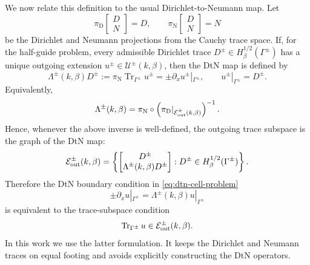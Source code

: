 \documentclass[11pt,fleqn]{article}
\theoremstyle{definition}
\theoremstyle{remark}
\begin{document}
We now relate this definition to the usual Dirichlet-to-Neumann map. Let
\[
  \pi_\mathrm{D}
  \begin{bmatrix}
    D\\ N
  \end{bmatrix}
  =D,
  \qquad
  \pi_\mathrm{N}
  \begin{bmatrix}
    D\\ N
  \end{bmatrix}
  =N
\]
be the Dirichlet and Neumann projections from the Cauchy trace space. If, for the
half-guide problem, every admissible Dirichlet trace \(D^\pm\in H^{1/2}_\beta(\Gamma^\pm)\)
has a unique outgoing extension \(u^\pm\in\mathcal U^\pm(k,\beta)\), then the DtN map is
defined by
\[
  \Lambda^\pm(k,\beta)D^\pm
  :=
  \pi_\mathrm{N} \operatorname{Tr}_{\Gamma^\pm}u^\pm
  =
  \pm \partial_x u^\pm|_{\Gamma^\pm},
  \qquad
  u^\pm|_{\Gamma^\pm}=D^\pm .
\]
Equivalently,
\[
  \Lambda^\pm(k,\beta)
  =
  \pi_\mathrm{N}\circ
  \left(
    \pi_\mathrm{D}|_{\mathcal E^\pm_{\rm out}(k,\beta)}
  \right)^{-1}.
\]
Hence, whenever the above inverse is well-defined, the outgoing trace subspace is the
graph of the DtN map:
\[
  \mathcal E^\pm_{\rm out}(k,\beta)
  =
  \left\{
    \begin{bmatrix}
      D^\pm\\
      \Lambda^\pm(k,\beta)D^\pm
    \end{bmatrix}
    :
    D^\pm\in H^{1/2}_\beta(\Gamma^\pm)
  \right\}.
\]
Therefore the DtN boundary condition in \eqref{eq:dtn-cell-problem}
\[
  \pm \partial_x u |_{\Gamma^\pm} = \Lambda^\pm(k,\beta) u |_{\Gamma^\pm}
\]
is equivalent to the trace-subspace condition
\[
  \operatorname{Tr}_{\Gamma^\pm}u\in \mathcal E^\pm_{\rm out}(k,\beta).
\]
In this work we use the latter formulation. It keeps the Dirichlet and Neumann traces
on equal footing and avoids explicitly constructing the DtN operators. 
\end{document}
